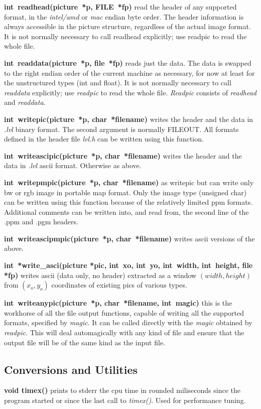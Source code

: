 \documentclass[11pt,twoside,english,a4paper]{article}
\begin{document}
\textbf{int~readhead(picture~{*p}, FILE~{*fp})} read the header of
any supported format, in the \emph{intel/amd} or \emph{mac} endian byte order. The header
information is always accessible in the picture structure, regardless
of the actual image format. It is not normally necessary to call readhead
explicitly; use readpic to read the whole file. 

\textbf{int~readdata(picture~{*p}, file~{*fp})} reads just the data.
The data is swapped  to the right endian order of the current machine as necessary,  
for now at least for the unstructured types (int and float).
It is not normally necessary to call \emph{readdata} explicitly; use \emph{readpic} to read
the whole file. \emph{Readpic} consists of \emph{readhead} and \emph{readdata}.

\textbf{int~writepic(picture~{*p}, char~{*filename})} writes the header and the data in \emph{.lvl} binary format. The second argument is normally FILEOUT. All formats defined in the header file \emph{lvl.h} can be written using this function. 

\textbf{int~writeascipic(picture~{*p}, char~{*filename})} writes the header and the data in \emph{.lvl} ascii format.
Otherwise as above.

\textbf{int~writepmpic(picture~{*p}, char~{*filename})} as writepic but can write
only bw or rgb image in portable map format. Only the image type (unsigned char) 
can be written using this function because of the relatively limited ppm formats.
Additional comments can be written into, and read from, 
the second line of the .ppm and .pgm headers. 

\textbf{int~writeascipmpic(picture~{*p}, char~{*filename})} writes ascii versions of the above.

\textbf{int~{*}write\_asci(picture {*}pic, int~xo, int~yo, int~width, int~height,  file {*}fp)} 
writes ascii (data only, no header) extracted as a window $(width,height)$ from 
$(x_o,y_o)$ coordinates of existing pics of various types.

\textbf{int~writeanypic(picture~{*p}, char~{*filename}, int~magic)} this is the workhorse of all the file output functions, capable of writing all the supported formats, specified by \emph{magic}. It can be called directly with the \emph{magic} obtained by \emph{readpic}. This will deal automagically with any kind of file and ensure that the output file will be of the same kind as the input file.

\subsection{Conversions and Utilities}
\textbf{void timex()} prints to stderr the cpu time in rounded miliseconds since the program
started or since the last call to \emph{timex()}. Used for performance tuning.
\end{document}

